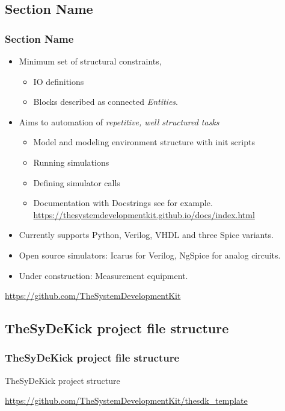 \documentclass{sdkslides}
\newcommand{\sectname}{Section Name}
\begin{document}
\subsection*{\sectname}
\begin{frame}[t]
    \frametitle{\sectname}
    \begin{itemize}
        \item Minimum set of structural constraints, 
            \begin{itemize}
                \item IO definitions
                \item Blocks described as connected \emph{Entities}.
            \end{itemize}
        \item Aims to automation of \emph{repetitive, well structured tasks}
            \begin{itemize}
                \item Model and modeling environment structure with init scripts
                \item Running simulations
                \item Defining simulator calls
                \item Documentation with Docstrings see for
                    example. {\tiny
                    \url{https://thesystemdevelopmentkit.github.io/docs/index.html}}
            \end{itemize}
        \item Currently supports Python, Verilog, VHDL and three Spice
            variants.
        \item Open source simulators: Icarus for Verilog, NgSpice for analog
            circuits.
        \item Under construction: Measurement equipment.
    \end{itemize}
    {\tiny \url{https://github.com/TheSystemDevelopmentKit}}
\end{frame}

\renewcommand{\sectionname}{TheSyDeKick project file structure}
\subsection*{\sectionname}
\begin{frame}[t]
    \frametitle{\sectionname}
    \begin{block}{TheSyDeKick project structure}
    \begin{minipage}[t]{0.3\textwidth}
    \parbox{\textwidth}{
    }
    \end{minipage}
    \end{block}
    {\tiny \url{https://github.com/TheSystemDevelopmentKit/thesdk_template}}
\end{frame}
\end{document}
